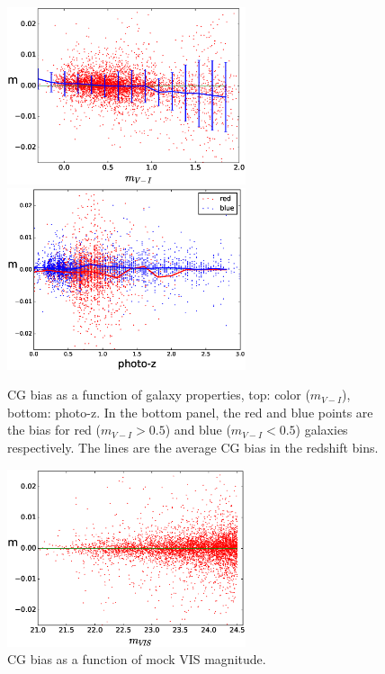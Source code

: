 \documentclass[useAMS,usenatbib]{mnras}
\begin{document}
%
\begin{figure}
\includegraphics[width=7.0cm]{zcolor17.eps}
\includegraphics[width=7.0cm]{zphotoz17.eps}
\caption{CG bias as a function of galaxy properties, top: color
  ($m_{V-I}$), bottom: photo-z. In the bottom panel, the red and blue
  points are the bias for red ($m_{V-I}>0.5$) and blue ($m_{V-I}<0.5$)
  galaxies respectively. The lines are the average CG bias in the
  redshift bins.}
\label{fig:cg2color}
\end{figure}
%
\begin{figure}
\includegraphics[width=7.0cm]{zcgb-magt17.eps}
\caption{CG bias as a function of mock VIS magnitude. }
\label{fig:cg2magvis}
\end{figure}
%
\end{document}
